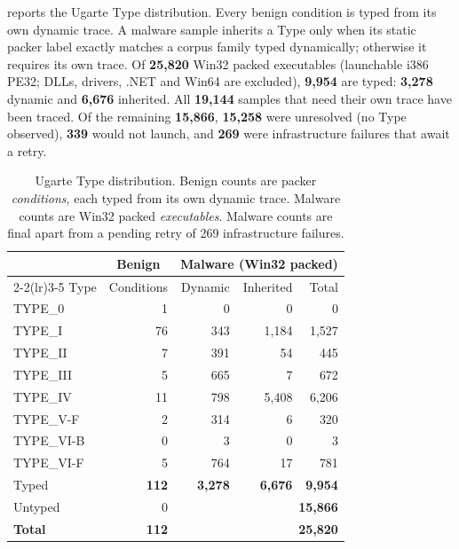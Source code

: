  reports the Ugarte Type distribution. Every benign condition
is typed from its own dynamic trace. A malware sample inherits a Type only when
its static packer label exactly matches a corpus family typed dynamically;
otherwise it requires its own trace. Of \textbf{25,820} Win32 packed executables (launchable i386 PE32; DLLs, drivers,
.NET and Win64 are excluded), \textbf{9,954} are typed: \textbf{3,278} dynamic and \textbf{6,676} inherited.
All \textbf{19,144} samples that need their own trace have been traced. Of the
remaining \textbf{15,866}, \textbf{15,258} were unresolved (no Type observed),
\textbf{339} would not launch, and \textbf{269} were infrastructure failures
that await a retry.

\begin{table}[t]
\centering
\caption{Ugarte Type distribution. Benign counts are packer \emph{conditions},
each typed from its own dynamic trace. Malware counts are Win32 packed
\emph{executables}. Malware counts are final apart from a pending retry of 269 infrastructure failures.}
\label{tab:typedist}
\footnotesize
\begin{tabular}{@{}lrrrr@{}}
\toprule
 & \multicolumn{1}{c}{Benign} & \multicolumn{3}{c}{Malware (Win32 packed)} \\
\cmidrule(lr){2-2}\cmidrule(lr){3-5}
Type & Conditions & Dynamic & Inherited & Total \\
\midrule
TYPE\_0     &   1 &     0 &     0 &     0 \\
TYPE\_I     &  76 &   343 & 1,184 & 1,527 \\
TYPE\_II    &   7 &   391 &    54 &   445 \\
TYPE\_III   &   5 &   665 &     7 &   672 \\
TYPE\_IV    &  11 &   798 & 5,408 & 6,206 \\
TYPE\_V-F   &   2 &   314 &     6 &   320 \\
TYPE\_VI-B  &   0 &     3 &     0 &     3 \\
TYPE\_VI-F  &   5 &   764 &    17 &   781 \\
\midrule
Typed       & \textbf{112} & \textbf{3,278} & \textbf{6,676} & \textbf{9,954} \\
Untyped     &   0 & \multicolumn{3}{r}{\textbf{15,866}} \\
\midrule
\textbf{Total} & \textbf{112} & \multicolumn{3}{r}{\textbf{25,820}} \\
\bottomrule
\end{tabular}
\end{table}

